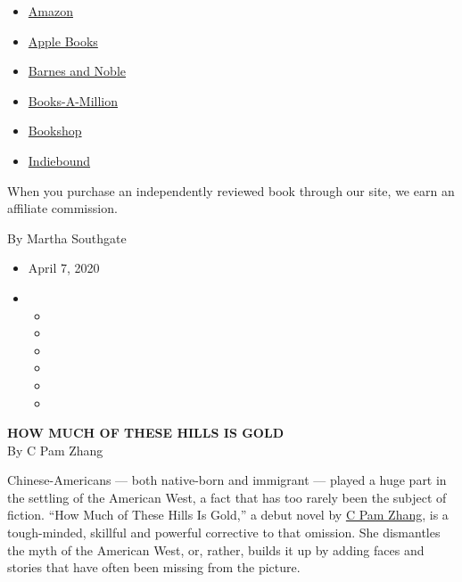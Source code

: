 \begin{itemize}
\tightlist
\item
  \href{https://www.amazon.com/gp/search?index=books\&tag=NYTBSREV-20\&field-keywords=How+Much+of+These+Hills+Is+Gold+C+Pam+Zhang}{Amazon}
\item
  \href{https://du-gae-books-dot-nyt-du-prd.appspot.com/buy?title=How+Much+of+These+Hills+Is+Gold\&author=C+Pam+Zhang}{Apple
  Books}
\item
  \href{https://www.anrdoezrs.net/click-7990613-11819508?url=https\%3A\%2F\%2Fwww.barnesandnoble.com\%2Fw\%2F\%3Fean\%3D9780525537205}{Barnes
  and Noble}
\item
  \href{https://www.anrdoezrs.net/click-7990613-35140?url=https\%3A\%2F\%2Fwww.booksamillion.com\%2Fp\%2FHow\%2BMuch\%2Bof\%2BThese\%2BHills\%2BIs\%2BGold\%2FC\%2BPam\%2BZhang\%2F9780525537205}{Books-A-Million}
\item
  \href{https://bookshop.org/a/3546/9780525537205}{Bookshop}
\item
  \href{https://www.indiebound.org/book/9780525537205?aff=NYT}{Indiebound}
\end{itemize}

When you purchase an independently reviewed book through our site, we
earn an affiliate commission.

By Martha Southgate

\begin{itemize}
\item
  April 7, 2020
\item
  \begin{itemize}
  \item
  \item
  \item
  \item
  \item
  \item
  \end{itemize}
\end{itemize}

\textbf{HOW MUCH OF THESE HILLS IS GOLD}\\
By C Pam Zhang

Chinese-Americans --- both native-born and immigrant --- played a huge
part in the settling of the American West, a fact that has too rarely
been the subject of fiction. ``How Much of These Hills Is Gold,'' a
debut novel by
\href{https://www.nytimes3xbfgragh.onion/2020/04/04/books/c-pam-zhang-how-much-of-these-hills-is-gold.html}{C
Pam Zhang}, is a tough-minded, skillful and powerful corrective to that
omission. She dismantles the myth of the American West, or, rather,
builds it up by adding faces and stories that have often been missing
from the picture.

